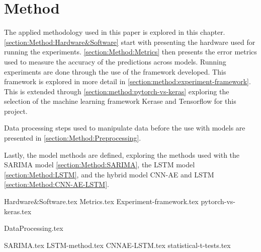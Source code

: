 \chapter{Method}
\label{section:Method}

The applied methodology used in this paper is explored in this chapter.
\cref{section:Method:Hardware&Software} start with presenting the hardware used for running the experiments.
\cref{section:Method:Metrics} then presents the error metrics used to measure the accuracy of the predictions across models.
Running experiments are done through the use of the framework developed. This framework is explored in more detail in \cref{section:method:experiment-framework}.
This is extended through \cref{section:method:pytorch-vs-keras} exploring the selection of the machine learning framework Kerase and Tensorflow for this project.

Data processing steps used to manipulate data before the use with models are presented in \cref{section:Method:Preprocessing}.

Lastly, the model methods are defined, exploring the methods used with the SARIMA model \cref{section:Method:SARIMA}, the LSTM model \cref{section:Method:LSTM},
and the hybrid model CNN-AE and LSTM \cref{section:Method:CNN-AE-LSTM}.


{Hardware&Software.tex}
{Metrics.tex}
{Experiment-framework.tex}
{pytorch-vs-keras.tex}

{DataProcessing.tex}

{SARIMA.tex}
{LSTM-method.tex}
{CNNAE-LSTM.tex}
{statistical-t-tests.tex}
